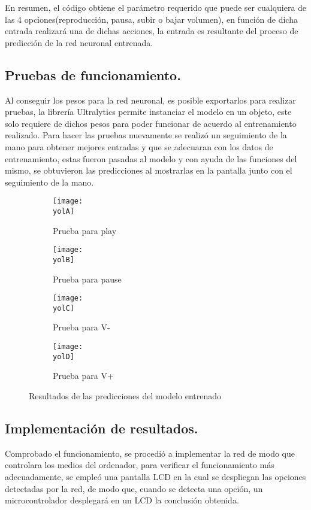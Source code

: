 \documentclass[a4paper, 12pt]{article}
\newcommand{\yolA}{img/test_yolo.png}
\newcommand{\yolB}{img/test_yolo1.png}
\newcommand{\yolC}{img/test_yolo2.png}
\newcommand{\yolD}{img/yolo_test3.png}
\newcommand{\code}{code/audio.py}
\begin{document}

	
	En resumen, el código obtiene el parámetro requerido que puede ser cualquiera de las 4 opciones(reproducción, pausa, subir o bajar volumen), en función de dicha entrada realizará una de dichas acciones, la entrada es resultante del proceso de predicción de la red neuronal entrenada.

	\subsection{Pruebas de funcionamiento.}
	Al conseguir los pesos para la red neuronal, es posible exportarlos para realizar pruebas, la librería Ultralytics permite instanciar el modelo en un objeto, este solo requiere de dichos pesos para poder funcionar de acuerdo al entrenamiento realizado. Para hacer las pruebas nuevamente se realizó un seguimiento de la mano para obtener mejores entradas y que se adecuaran con los datos de entrenamiento, estas fueron pasadas al modelo y con ayuda de las funciones del mismo, se obtuvieron las predicciones al mostrarlas en la pantalla junto con el seguimiento de la mano.

	\begin{figure}[H]
        \centering

		\begin{subfigure}{0.5\linewidth}
			\texttt{[image: \\yolA]}
			\caption{Prueba para play}
			\label{sub:play}
		\end{subfigure}

		\begin{subfigure}{0.5\linewidth}
			\texttt{[image: \\yolB]}
			\caption{Prueba para pause}
			\label{sub:pause}
		\end{subfigure}

		\begin{subfigure}{0.5\linewidth}
			\texttt{[image: \\yolC]}
			\caption{Prueba para V-}
			\label{sub:v+}
		\end{subfigure}

		\begin{subfigure}{0.5\linewidth}
			\texttt{[image: \\yolD]}
			\caption{Prueba para V+}
			\label{sub:v-}
		\end{subfigure}

		\caption{Resultados de las predicciones del modelo entrenado}
	\end{figure}

	\subsection{Implementación de resultados.}
	Comprobado el funcionamiento, se procedió a implementar la red de modo que controlara los medios del ordenador, para verificar el funcionamiento más adecuadamente, se empleó una pantalla LCD en la cual se despliegan las opciones detectadas por la red, de modo que, cuando se detecta una opción, un microcontrolador desplegará en un LCD la conclusión obtenida.
\end{document}
